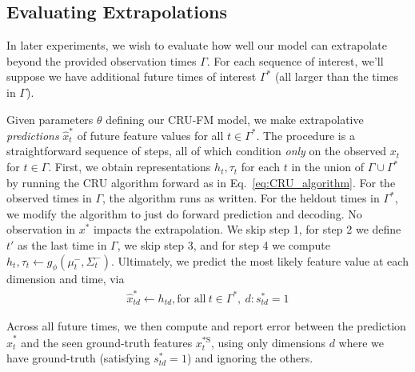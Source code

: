\subsection{Evaluating Extrapolations}
\label{sec:evaluating_extrapolations}
In later experiments, we wish to evaluate how well our model can extrapolate beyond the provided observation times $\Gamma$. For each sequence of interest, we'll suppose we have additional future times of interest $\Gamma^*$ (all larger than the times in $\Gamma$).


Given parameters $\theta$ defining our CRU-FM model, we make extrapolative \emph{predictions} $\hat{x}^*_t$ of future feature values for all $t\in \Gamma^*$. The procedure is a straightforward sequence of steps, all of which condition \emph{only} on the observed $x_t$ for $t \in \Gamma$.
First, we obtain representations $h_t, \tau_t$ for each $t$ in the union of $\Gamma \cup \Gamma^*$ by running the CRU algorithm forward as in Eq.~\eqref{eq:CRU_algorithm}.
For the observed times in $\Gamma$, the algorithm runs as written.
For the heldout times in $\Gamma^*$, we modify the algorithm to just do forward prediction and decoding. No observation in $x^*$ impacts the extrapolation. We skip step 1, for step 2 we define $t'$ as the last time in $\Gamma$, we skip step 3, and for step 4 we compute $h_t, \tau_t \gets g_{\phi}(\mu^-_t, \Sigma^-_t)$. Ultimately, we predict the most likely feature value at each dimension and time, via
\begin{align}
    \hat{x}^*_{td} \gets h_{td}, \text{for all}~ t \in \Gamma^*, ~d : s^*_{td} {=} 1
\end{align}

Across all future times, we then compute and report error between the prediction $\hat{x}^*_t$ and the seen ground-truth features $x^{*\text{S}}_t$, using only dimensions $d$ where we have ground-truth (satisfying $s^*_{td} = 1$) and ignoring the others.


